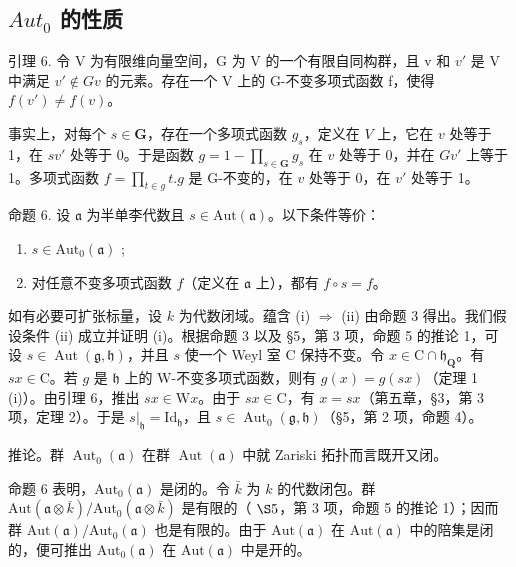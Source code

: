 \subsection{\texorpdfstring{\(Aut_{0}\) 的性质}{Aut\_\{0\} 的性质}}

引理 6. 令 V 为有限维向量空间，G 为 V 的一个有限自同构群，且 v 和 \(v'\) 是 V 中满足 \(v' \notin Gv\) 的元素。存在一个 V 上的 G-不变多项式函数 f，使得 \(f(v') \neq f(v)\)。

事实上，对每个 \(s \in \mathbf{G}\)，存在一个多项式函数 \(g_{s}\)，定义在 \(V\) 上，它在 \(v\) 处等于 1，在 \(sv'\) 处等于 0。于是函数 \(g = 1 - \prod_{s \in \mathbf{G}} g_{s}\) 在 \(v\) 处等于 0，并在 \(Gv'\) 上等于 1。多项式函数 \(f = \prod_{t \in g} t.g\) 是 G-不变的，在 \(v\) 处等于 0，在 \(v'\) 处等于 1。

命题 6. 设 \(\mathfrak{a}\) 为半单李代数且 \(s\in \mathrm{Aut}(\mathfrak{a})\)。以下条件等价：

\begin{enumerate}
\def\labelenumi{(\roman{enumi})}
\item
  \(s \in \text{Aut}_{0}(\mathfrak{a})\) ;
\item
对任意不变多项式函数 \(f\)（定义在 \(\mathfrak{a}\) 上），都有 \(f \circ s = f\)。
\end{enumerate}

如有必要可扩张标量，设 \(k\) 为代数闭域。蕴含 (i) \(\Longrightarrow\) (ii) 由命题 3 得出。我们假设条件 (ii) 成立并证明 (i)。根据命题 3 以及 §5，第 3 项，命题 5 的推论 1，可设 \(s \in \operatorname{Aut}(\mathfrak{g}, \mathfrak{h})\)，并且 \(s\) 使一个 Weyl 室 C 保持不变。令 \(x \in \mathrm{C} \cap \mathfrak{h}_{\mathbf{Q}}\)。有 \(sx \in \mathrm{C}\)。若 \(g\) 是 \(\mathfrak{h}\) 上的 W-不变多项式函数，则有 \(g(x) = g(sx)\)（定理 1 (i)）。由引理 6，推出 \(sx \in \mathrm{W}x\)。由于 \(sx \in \mathrm{C}\)，有 \(x = sx\)（第五章，§3，第 3 项，定理 2）。于是 \(s|_{\mathfrak{h}} = \mathrm{Id}_{\mathfrak{h}}\)，且 \(s \in \operatorname{Aut}_0(\mathfrak{g}, \mathfrak{h})\)（§5，第 2 项，命题 4）。

推论。群 \(\operatorname{Aut}_{0}(\mathfrak{a})\) 在群 \(\operatorname{Aut}(\mathfrak{a})\) 中就 Zariski 拓扑而言既开又闭。

命题 6 表明，\(\mathrm{Aut}_0(\mathfrak{a})\) 是闭的。令 \(\bar{k}\) 为 \(k\) 的代数闭包。群 \(\mathrm{Aut}(\mathfrak{a} \otimes \bar{k}) / \mathrm{Aut}_0(\mathfrak{a} \otimes \bar{k})\) 是有限的（ \(\S 5\)，第 3 项，命题 5 的推论 1）；因而群 \(\mathrm{Aut}(\mathfrak{a}) / \mathrm{Aut}_0(\mathfrak{a})\) 也是有限的。由于 \(\mathrm{Aut}(\mathfrak{a})\) 在 \(\mathrm{Aut}(\mathfrak{a})\) 中的陪集是闭的，便可推出 \(\mathrm{Aut}_0(\mathfrak{a})\) 在 \(\mathrm{Aut}(\mathfrak{a})\) 中是开的。
\relax{}
